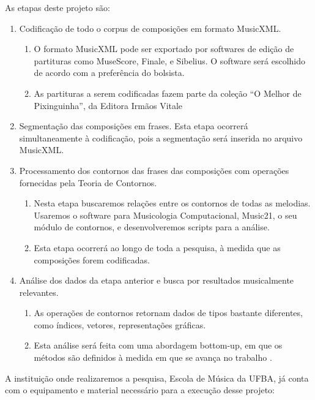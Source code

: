 \documentclass[11pt]{article}
\begin{document}
As etapas deste projeto são:
\begin{enumerate}
\item Codificação de todo o corpus de composições em formato MusicXML.
  \begin{enumerate}
  \item O formato MusicXML pode ser exportado por softwares de edição
    de partituras como MuseScore, Finale, e Sibelius. O software será
    escolhido de acordo com a preferência do bolsista.
  \item As partituras a serem codificadas fazem parte da coleção ``O
    Melhor de Pixinguinha'', da Editora Irmãos Vitale
  \end{enumerate}
\item Segmentação das composições em frases. Esta etapa ocorrerá
  simultaneamente à codificação, pois a segmentação será inserida no
  arquivo MusicXML.
\item Processamento dos contornos das frases das composições com
  operações fornecidas pela Teoria de Contornos.
  \begin{enumerate}
  \item Nesta etapa buscaremos relações entre os contornos de todas as
    melodias. Usaremos o software para Musicologia Computacional,
    Music21, o seu módulo de contornos, e desenvolveremos scripts para
    a análise.
  \item Esta etapa ocorrerá ao longo de toda a pesquisa, à medida que
    as composições forem codificadas.
  \end{enumerate}
\item Análise dos dados da etapa anterior e busca por resultados
  musicalmente relevantes.
  \begin{enumerate}
  \item As operações de contornos retornam dados de tipos bastante
    diferentes, como índices, vetores, representações gráficas.
  \item Esta análise será feita com uma abordagem bottom-up, em que os
    métodos são definidos à medida em que se avança no trabalho
    \cite{Graham1994}.
  \end{enumerate}
\end{enumerate}



A instituição onde realizaremos a pesquisa, Escola de Música da UFBA,
já conta com o equipamento e material necessário para a execução desse
projeto:
\end{document}
